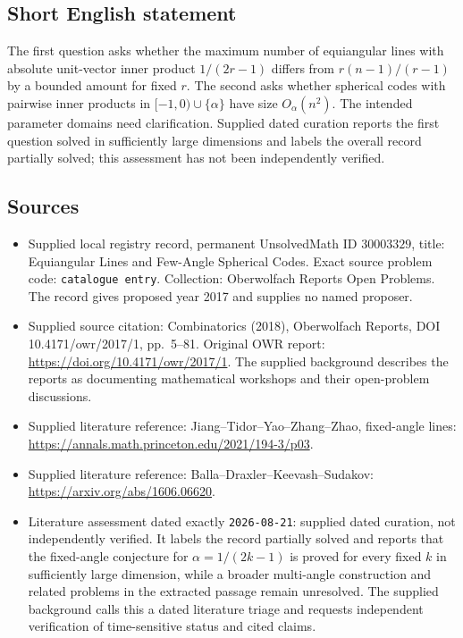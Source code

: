 \documentclass[11pt]{article}
\begin{document}
\subsection{Short English statement}
The first question asks whether the maximum number of equiangular lines with absolute unit-vector inner product \(1/(2r-1)\) differs from \(r(n-1)/(r-1)\) by a bounded amount for fixed \(r\). The second asks whether spherical codes with pairwise inner products in \([-1,0)\cup\{\alpha\}\) have size \(O_\alpha(n^2)\). The intended parameter domains need clarification. Supplied dated curation reports the first question solved in sufficiently large dimensions and labels the overall record partially solved; this assessment has not been independently verified.
\subsection{Sources}
\begin{itemize}
\item Supplied local registry record, permanent UnsolvedMath ID \(30003329\), title: Equiangular Lines and Few-Angle Spherical Codes. Exact source problem code: \texttt{catalogue entry}. Collection: Oberwolfach Reports Open Problems. The record gives proposed year 2017 and supplies no named proposer.
\item Supplied source citation: Combinatorics (2018), Oberwolfach Reports, DOI 10.4171/owr/2017/1, pp.\ 5--81. Original OWR report: \url{https://doi.org/10.4171/owr/2017/1}. The supplied background describes the reports as documenting mathematical workshops and their open-problem discussions.
\item Supplied literature reference: Jiang--Tidor--Yao--Zhang--Zhao, fixed-angle lines: \url{https://annals.math.princeton.edu/2021/194-3/p03}.
\item Supplied literature reference: Balla--Draxler--Keevash--Sudakov: \url{https://arxiv.org/abs/1606.06620}.
\item Literature assessment dated exactly \texttt{2026-08-21}: supplied dated curation, not independently verified. It labels the record partially solved and reports that the fixed-angle conjecture for \(\alpha=1/(2k-1)\) is proved for every fixed \(k\) in sufficiently large dimension, while a broader multi-angle construction and related problems in the extracted passage remain unresolved. The supplied background calls this a dated literature triage and requests independent verification of time-sensitive status and cited claims.
\end{itemize}
\end{document}
